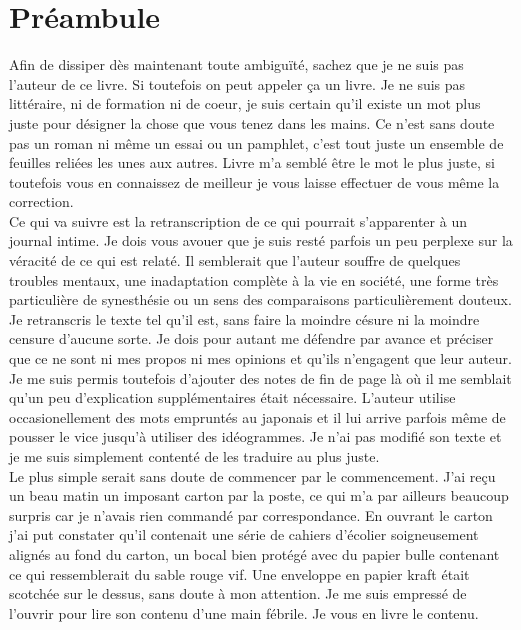 \chapter{Préambule}

Afin de dissiper dès maintenant toute ambiguïté, sachez que je ne suis pas l'auteur de ce livre. Si toutefois on peut appeler ça un livre. Je ne suis pas littéraire, ni de formation ni de coeur, je suis certain qu'il existe un mot plus juste pour désigner la chose que vous tenez dans les mains. Ce n'est sans doute pas un roman ni même un essai ou un pamphlet, c'est tout juste un ensemble de feuilles reliées les unes aux autres. Livre m'a semblé être le mot le plus juste, si toutefois vous en connaissez de meilleur je vous laisse effectuer de vous même la correction. \\

Ce qui va suivre est la retranscription de ce qui pourrait s'apparenter à un journal intime. Je dois vous avouer que je suis resté parfois un peu perplexe sur la véracité de ce qui est relaté. Il semblerait que l'auteur souffre de quelques troubles mentaux, une inadaptation complète à la vie en société, une forme très particulière de synesthésie ou un sens des comparaisons particulièrement douteux.\\

Je retranscris le texte tel qu'il est, sans faire la moindre césure ni la moindre censure d'aucune sorte. Je dois pour autant me défendre par avance et préciser que ce ne sont ni mes propos ni mes opinions et qu'ils n'engagent que leur auteur. Je me suis permis toutefois d'ajouter des notes de fin de page là où il me semblait qu'un peu d'explication supplémentaires était nécessaire. L'auteur utilise occasionellement des mots empruntés au japonais et il lui arrive parfois même de pousser le vice jusqu'à utiliser des idéogrammes. Je n'ai pas modifié son texte et je me suis simplement contenté de les traduire au plus juste.\\

Le plus simple serait sans doute de commencer par le commencement. J'ai reçu un beau matin un imposant carton par la poste, ce qui m'a par ailleurs beaucoup surpris car je n'avais rien commandé par correspondance. En ouvrant le carton j'ai put constater qu'il contenait une série de cahiers d'écolier soigneusement alignés au fond du carton, un bocal bien protégé avec du papier bulle contenant ce qui ressemblerait du sable rouge vif. Une enveloppe en papier kraft était scotchée sur le dessus, sans doute à mon attention. Je me suis empressé de l'ouvrir pour lire son contenu d'une main fébrile. Je vous en livre le contenu.\\

